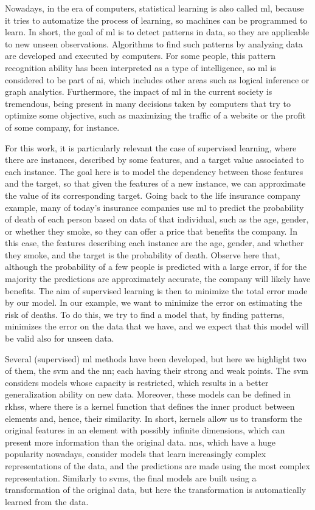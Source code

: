 Nowadays, in the era of computers, statistical learning is also called \acrfull{ml}, because it tries to automatize the process of learning, so machines can be programmed to learn. In short, the goal of \acrshort{ml} is to detect patterns in data, so they are applicable to new unseen observations. Algorithms to find such patterns by analyzing data are developed and executed by computers.
%
For some people, this pattern recognition ability has been interpreted as a type of intelligence, so \acrshort{ml} is considered to be part of \acrfull{ai}, which includes other areas such as logical inference or graph analytics.
%
Furthermore, the impact of \acrshort{ml} in the current society is tremendous, being present in many decisions taken by computers that try to optimize some objective, such as maximizing the traffic of a website or the profit of some company, for instance.

For this work, it is particularly relevant the case of supervised learning, where there are instances, described by some features, and a target value associated to each instance. The goal here is to model the dependency between those features and the target, so that given the features of a new instance, we can approximate the value of its corresponding target. Going back to the life insurance company example, many of today's insurance companies use \acrshort{ml} to predict the probability of death of each person based on data of that individual, such as the age, gender, or whether they smoke, so they can offer a price that benefits the company. In this case, the features describing each instance are the age, gender, and whether they smoke, and the target is the probability of death.
%
Observe here that, although the probability of a few people is predicted with a large error, if for the majority the predictions are approximately accurate, the company will likely have benefits.
%
The aim of supervised learning is then to minimize the total error made by our model. In our example, we want to minimize the error on estimating the risk of deaths.
%
To do this, we try to find a model that, by finding patterns, minimizes the error on the data that we have, and we expect that this model will be valid also for unseen data.

Several (supervised) \acrshort{ml} methods have been developed, but here we highlight two of them, the \acrfull{svm} and the \acrfull{nn}; each having their strong and weak points. 
%
The \acrfull{svm} considers models whose capacity is restricted, which results in a better generalization ability on new data. Moreover, these models can be defined in \acrfull{rkhss}, where there is a kernel function that defines the inner product between elements and, hence, their similarity. In short, kernels allow us to transform the original features in an element with possibly infinite dimensions, which can present more information than the original data. 
%
\acrfull{nns}, which have a huge popularity nowadays, consider models that learn increasingly complex representations of the data, and the predictions are made using the most complex representation. Similarly to \acrshort{svms}, the final models are built using a transformation of the original data, but here the transformation is automatically learned from the data.

